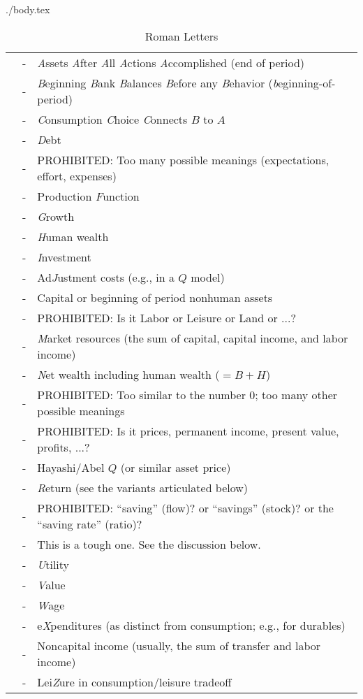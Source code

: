 \message{ !name(Variables-Single-Letter.tex)}\documentclass{econtex}
\begin{document}
\begin{verbatimwrite}{./body.tex}
\begin{table}[h]
\begin{center}
\begin{tabular}{lcl} \\
    \ALev & - & {\it A}ssets {\it A}fter {\it A}ll {\it A}ctions {\it A}ccomplished (end of period)
\\  \BLev & - & {\it B}eginning {\it B}ank {\it B}alances {\it B}efore any {\it B}ehavior ({\it b}eginning-of-period)
\\  \CLev & - & {\it C}onsumption {\it C}hoice {\it C}onnects $B$ to $A$
\\  \DLev & - & {\it D}ebt
\\  \ELev & - & PROHIBITED:  Too many possible meanings (expectations, effort, expenses)
\\  \FLev & - & Production {\it F}unction
\\  \GLev & - & {\it G}rowth 
\\  \HLev & - & {\it H}uman wealth
\\  \ILev & - & {\it I}nvestment
\\  \JLev & - & Ad{\it J}ustment costs (e.g., in a $Q$ model)
\\  \KLev & - & Capital or beginning of period nonhuman assets
\\  \LLev & - & PROHIBITED: Is it Labor or Leisure or Land or ...?
\\  \MLev & - & {\it M}arket resources (the sum of capital, capital income, and labor income)
\\  \NLev & - & {\it N}et wealth including human wealth ($=B + H$)
\\  \OLev & - & PROHIBITED: Too similar to the number 0; too many other possible meanings
\\  \PLev & - & PROHIBITED: Is it prices, permanent income, present value, profits, ...?
\\  \QLev & - & Hayashi/Abel $Q$ (or similar asset price)
\\  \RLev & - & {\it R}eturn (see the variants articulated below)
\\  \SLev & - & PROHIBITED: ``saving'' (flow)? or ``savings'' (stock)? or the ``saving rate'' (ratio)?
\\  \TLev & - & This is a tough one.  See the discussion below.
\\  \ULev & - & {\it U}tility
\\  \VLev & - & {\it V}alue
\\  \WLev & - & {\it W}age
\\  \XLev & - & e{\it X}penditures (as distinct from consumption; e.g., for durables)
\\  \YLev & - & Noncapital income (usually, the sum of transfer and labor income)
\\  \ZLev & - & Lei{\it Z}ure in consumption/leisure tradeoff
\end{tabular}
\end{center}
\caption{Roman Letters}
\label{table:RomanLetters}
\end{table}


\end{verbatimwrite}
\end{document}

